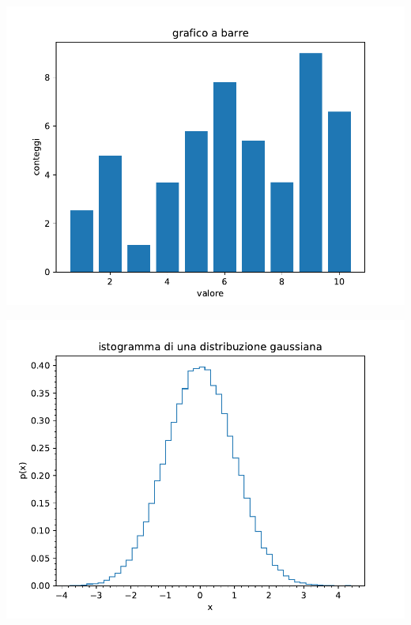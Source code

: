 \documentclass[10pt,a4paper]{article}
\begin{document}
\begin{multicols}{2}


\includegraphics[scale=0.5]{img/isto1.pdf}


\includegraphics[scale=0.5]{img/isto2.pdf}


\end{multicols}
\end{document}
